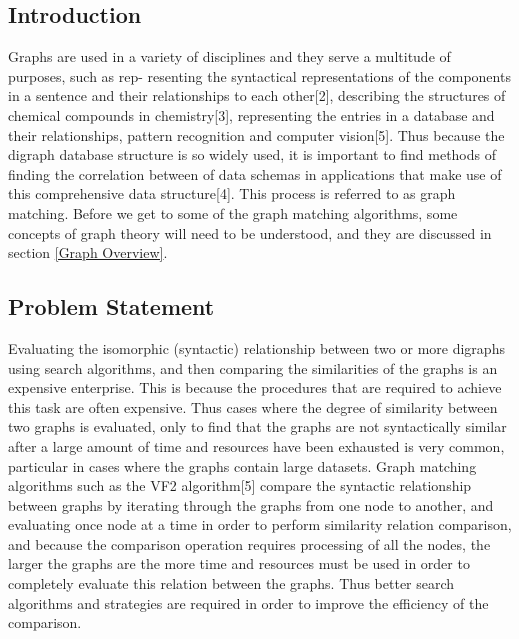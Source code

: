 \label{Introduction}
\subsection{Introduction}
Graphs are used in a variety of disciplines and they serve a multitude of purposes, such as rep-
resenting the syntactical representations of the components in a sentence and their relationships
to each other[2], describing the structures of chemical compounds in chemistry[3], representing
the entries in a database and their relationships, pattern recognition and computer vision[5]. Thus
because the digraph database structure is so widely used, it is important to find methods of finding
the correlation between of data schemas in applications that make use of this comprehensive data
structure[4]. This process is referred to as graph matching. Before we get to some of the graph
matching algorithms, some concepts of graph theory will need to be understood, and they are discussed in section \ref{Graph Overview}.

\subsection{Problem Statement}
Evaluating the isomorphic (syntactic) relationship between two or more digraphs
using search algorithms, and then comparing the similarities of the graphs is an expensive enterprise. 
This is because the procedures that are required to achieve this task are often expensive.
Thus cases where the degree of similarity between two graphs is evaluated,
only to find that the graphs are not syntactically similar after a large amount of time and resources
have been exhausted is very common, particular in cases where the graphs contain large datasets.\newline\newline
Graph matching algorithms such as the VF2 algorithm[5] compare the syntactic relationship between graphs by iterating through the graphs
from one node to another, and evaluating once node at a time in order to perform similarity relation comparison, and because the comparison
operation requires processing of all the nodes, the larger the graphs are the more time and resources must be used in order to completely evaluate this
relation between the graphs. Thus better search algorithms and strategies are required in order to
improve the efficiency of the comparison.

